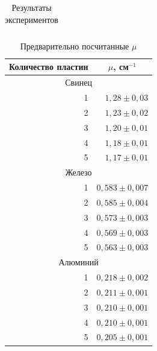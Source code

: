 \begin{enumerate}
\begin{table}[h!]
{\begin{tabular}{|rrcc|rrrllrrr}
				\end{tabular}%
			}
		\caption{Результаты экспериментов}
		\label{WeakCoeff_Table}
		\end{table}
		\begin{table}[h!]
			\centering
			\begin{tabular}{|rrll|}
				\hline
				\multicolumn{1}{|r|}{Количество пластин} & \multicolumn{3}{c|}{$\mu$, см$^{-1}$}  \\ \hline
				\multicolumn{4}{|c|}{Свинец}                                                      \\ \hline
				\multicolumn{1}{|r|}{1}                  & \multicolumn{3}{r|}{$1,28 \pm 0,03$}   \\ \hline
				\multicolumn{1}{|r|}{2}                  & \multicolumn{3}{r|}{$1,23 \pm 0,02$}   \\ \hline
				\multicolumn{1}{|r|}{3}                  & \multicolumn{3}{r|}{$1,20 \pm 0,01$}   \\ \hline
				\multicolumn{1}{|r|}{4}                  & \multicolumn{3}{r|}{$1,18 \pm 0,01$}   \\ \hline
				\multicolumn{1}{|r|}{5}                  & \multicolumn{3}{r|}{$1,17 \pm 0,01$}   \\ \hline
				\multicolumn{4}{|c|}{Железо}                                                      \\ \hline
				\multicolumn{1}{|r|}{1}                  & \multicolumn{3}{r|}{$0,583 \pm 0,007$} \\ \hline
				\multicolumn{1}{|r|}{2}                  & \multicolumn{3}{r|}{$0,585 \pm 0,004$} \\ \hline
				\multicolumn{1}{|r|}{3}                  & \multicolumn{3}{r|}{$0,573 \pm 0,003$} \\ \hline
				\multicolumn{1}{|r|}{4}                  & \multicolumn{3}{r|}{$0,569 \pm 0,003$} \\ \hline
				\multicolumn{1}{|r|}{5}                  & \multicolumn{3}{r|}{$0,563 \pm 0,003$} \\ \hline
				\multicolumn{4}{|c|}{Алюминий}                                                    \\ \hline
				\multicolumn{1}{|r|}{1}                  & \multicolumn{3}{r|}{$0,218 \pm 0,002$} \\ \hline
				\multicolumn{1}{|r|}{2}                  & \multicolumn{3}{r|}{$0,211 \pm 0,001$} \\ \hline
				\multicolumn{1}{|r|}{3}                  & \multicolumn{3}{r|}{$0,210 \pm 0,001$} \\ \hline
				\multicolumn{1}{|r|}{4}                  & \multicolumn{3}{r|}{$0,210 \pm 0,001$} \\ \hline
				\multicolumn{1}{|r|}{5}                  & \multicolumn{3}{r|}{$0,205 \pm 0,001$} \\ \hline
			\end{tabular}
		\caption{Предварительно посчитанные $\mu$}
		\label{WeakCoeff_PreTable}
		\end{table}
	
	
	
	\end{enumerate}	
